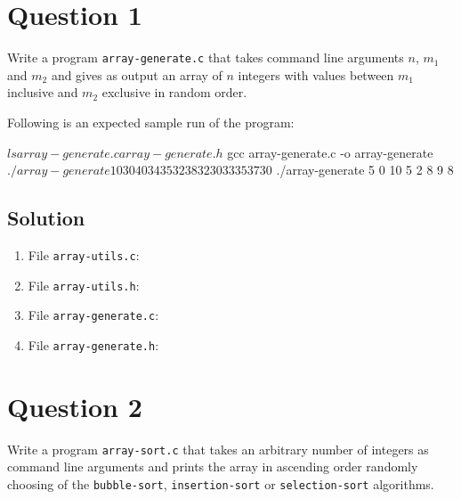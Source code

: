 \documentclass[12pt,letterpaper,twoside]{article}
\begin{document}


\section*{Question 1}

Write a program \texttt{array-generate.c} that takes command line arguments $n$, $m_1$ and $m_2$ and gives as output an array of $n$ integers with values between $m_1$ inclusive and $m_2$ exclusive in random order.

Following is an expected sample run of the program:

\begin{terminal}
$ ls
array-generate.c array-generate.h
$ gcc array-generate.c -o array-generate
$ ./array-generate 10 30 40
34 35 32 38 32 30 33 35 37 30
$ ./array-generate 5 0 10
5 2 8 9 8
\end{terminal}

\subsection*{Solution}

\lstset{language=c,tabsize=4}
\begin{enumerate}
\item File \texttt{array-utils.c}:

\item File \texttt{array-utils.h}:

\item File \texttt{array-generate.c}:

\item File \texttt{array-generate.h}:

\end{enumerate}

\section*{Question 2}

Write a program \texttt{array-sort.c} that takes an arbitrary number of integers as command line arguments and prints the array in ascending order randomly choosing of the \texttt{bubble-sort}, \texttt{insertion-sort} or \texttt{selection-sort} algorithms.
\end{document}
